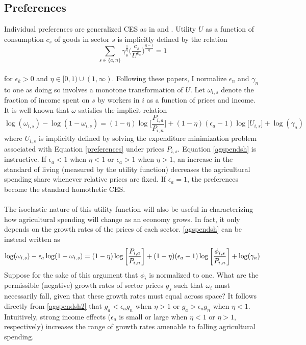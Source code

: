 \documentclass[]{article}
\theoremstyle{plain}
\begin{document}
\subsection*{Preferences}
Individual preferences are generalized CES as in \citet{cominetal2021} and \citet{engelslawglobal}. Utility $U$ as a function of consumption $c_{s}$ of goods in sector $s$ is implicitly defined by the relation 
\begin{equation}\label{preferences}
	\sum_{s \in \{a, n\}}\gamma_{s}^{\frac{1}{\eta}}\bigg(\frac{c_{s}}{U^{\epsilon_{s}}}\bigg)^{\frac{\eta - 1}{\eta}} = 1
\end{equation}
\paragraph*{}
 for $\epsilon_{k} > 0$ and $\eta \in [0, 1)\cup(1, \infty) $. Following these papers, I normalize $\epsilon_{n}$ and $\gamma_{n}$ to one as doing so involves a monotone transformation of $U$. Let $\omega_{i,s}$ denote the fraction of income spent on $s$ by workers in $i$ as a function of prices and income. It is well known that $\omega$ satisfies the implicit relation
\begin{equation}\label{agspendsh}
	\log(\omega_{i,s}) - \log(1-\omega_{i,s}) = (1-\eta)\log\bigg[\frac{P_{i,a}}{P_{i,n}}\bigg] + (1-\eta)(\epsilon_{a} - 1)\log\big[U_{i, s}\big] + \log(\gamma_{a})
\end{equation}
where $U_{i, s}$ is implicitly defined by solving the expenditure minimization problem associated with Equation \eqref{preferences} under prices $P_{i, s}$. Equation \eqref{agspendsh} is instructive. If $\epsilon_{a} < 1$ when $\eta < 1$ or $\epsilon_{a} > 1$ when $\eta > 1$, an increase in the standard of living (measured by the utility function) decreases the agricultural spending share whenever relative prices are fixed. If $\epsilon_{a} = 1$, the preferences become the standard homothetic CES. 
\paragraph*{}
The isoelastic nature of this utility function will also be useful in characterizing how agricultural spending will change as an economy grows. In fact, it only depends on the growth rates of the prices of each sector. \eqref{agspendsh} can be instead written as 
\begin{equation} \label{agspendsh2}
	\small
	\log(\omega_{i,s}) - \epsilon_{a}\log(1-\omega_{i,s}) = (1-\eta)\log\bigg[\frac{P_{i,a}}{P_{i,n}}\bigg] + (1-\eta)(\epsilon_{a} - 1)\log\bigg[\frac{\phi_{i, s}}{P_{i, n}}\bigg] + \log(\gamma_{a})
\end{equation}
Suppose for the sake of this argument that $\phi_{i}$ is normalized to one. What are the permissible (negative) growth rates of sector prices $g_{s}$ such that $\omega_{i}$ must necessarily fall, given that these growth rates must equal across space? It follows directly from \eqref{agspendsh2} that $g_{a} < \epsilon_{a}g_{n}$ when $\eta > 1$ or $g_{a} > \epsilon_{a}g_{n}$ when $\eta < 1$. Intuitively, strong income effects ($\epsilon_{a}$ is small or large when $\eta < 1$ or $\eta > 1$, respectively) increases the range of growth rates amenable to falling agricultural spending. 
\end{document}
